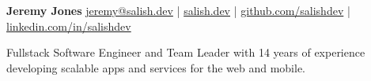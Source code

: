 \documentclass{resume} %
\begin{document}
\begingroup

\vspace*{-2em}
{\Huge \textbf{Jeremy Jones}} \hfill
\vspace*{-1em}
\normalsize{\href{mailto:jeremy@salish.dev}{jeremy@salish.dev} %
| \href{https://salish.dev}{salish.dev} %
| \href{https://github.com/salishdev}{github.com/salishdev} %
| \href{https://linkedin.com/in/salishdev}{linkedin.com/in/salishdev}} %
\nameskip\break
\endgroup




  Fullstack Software Engineer and Team Leader with 14 years of experience developing scalable apps and services for the web and mobile.
\end{document}

